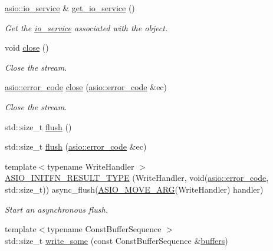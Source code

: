 \begin{DoxyCompactItemize}
\hyperlink{classasio_1_1io__service}{asio\+::io\+\_\+service} \& \hyperlink{classasio_1_1buffered__stream_ad090d38bcdd2f795d4be30ae9280ce99}{get\+\_\+io\+\_\+service} ()
\begin{DoxyCompactList}\small\item\em Get the \hyperlink{classasio_1_1io__service}{io\+\_\+service} associated with the object. \end{DoxyCompactList}\item 
void \hyperlink{classasio_1_1buffered__stream_a6369d423aa650a4d68b853c193ffc7cf}{close} ()
\begin{DoxyCompactList}\small\item\em Close the stream. \end{DoxyCompactList}\item 
\hyperlink{classasio_1_1error__code}{asio\+::error\+\_\+code} \hyperlink{classasio_1_1buffered__stream_aca80445f4cfe7f2896b51946d20c16a9}{close} (\hyperlink{classasio_1_1error__code}{asio\+::error\+\_\+code} \&ec)
\begin{DoxyCompactList}\small\item\em Close the stream. \end{DoxyCompactList}\item 
std\+::size\+\_\+t \hyperlink{classasio_1_1buffered__stream_ae7cf9a72a757e954ae218cad504ccc31}{flush} ()
\item 
std\+::size\+\_\+t \hyperlink{classasio_1_1buffered__stream_aa78485b8dffa53f18b591c066d6c3021}{flush} (\hyperlink{classasio_1_1error__code}{asio\+::error\+\_\+code} \&ec)
\item 
{\footnotesize template$<$typename Write\+Handler $>$ }\\\hyperlink{classasio_1_1buffered__stream_a25113d83af5e2ba0c57c1b467df58372}{A\+S\+I\+O\+\_\+\+I\+N\+I\+T\+F\+N\+\_\+\+R\+E\+S\+U\+L\+T\+\_\+\+T\+Y\+P\+E} (Write\+Handler, void(\hyperlink{classasio_1_1error__code}{asio\+::error\+\_\+code}, std\+::size\+\_\+t)) async\+\_\+flush(\hyperlink{classasio_1_1buffered__stream_a5bcc9cc7a14cb42d13454faee7828a4c}{A\+S\+I\+O\+\_\+\+M\+O\+V\+E\+\_\+\+A\+R\+G}(Write\+Handler) handler)
\begin{DoxyCompactList}\small\item\em Start an asynchronous flush. \end{DoxyCompactList}\item 
{\footnotesize template$<$typename Const\+Buffer\+Sequence $>$ }\\std\+::size\+\_\+t \hyperlink{classasio_1_1buffered__stream_a6911582c6e829ac7bebc1d6dc6b81065}{write\+\_\+some} (const Const\+Buffer\+Sequence \&\hyperlink{group__async__read_ga54dede45c3175148a77fe6635222c47d}{buffers})

\end{DoxyCompactItemize}
